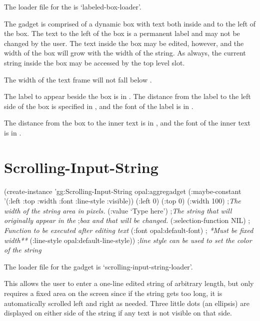 The loader file for the  is `labeled-box-loader'.

The  gadget is comprised of a dynamic box with text
both inside and to the left of the box.  The text to the left of the
box is a permanent label and may not be changed by the user.  The text
inside the box may be edited, however, and the width of the box will
grow with the width of the string.  As always, the current string
inside the box may be accessed by the top level  slot.

The width of the text frame will not fall below .

The label to appear beside the box is in .  The
distance from the label to the left side of the box is specified in
, and the font of the label is in .

The distance from the box to the inner text is in ,
and the font of the inner text is in .

\section{Scrolling-Input-String}
\label{scrolling-input-string}

\begin{programexample}
(create-instance 'gg:Scrolling-Input-String opal:aggregadget
   (:maybe-constant '(:left :top :width :font :line-style :visible))
   (:left 0)
   (:top 0)
   (:width 100) ;{\it  The width of the string area in pixels.}
   (:value `Type here') ;{\it The string that will originally appear in the}
			;{\it   box and that will be changed.}
   (:selection-function NIL) ; {\it Function to be executed after editing text}
   (:font opal:default-font) ; {\it **Must be fixed width**}
   (:line-style opal:default-line-style)) ;{\it line style can be used to set the color of the string}
\end{programexample}

\begin{center}
\end{center}

The loader file for the  gadget is
`scrolling-input-string-loader'.

This allows the user to enter a one-line edited string of arbitrary
length, but only requires a fixed area on the screen since if the
string gets too long, it is automatically scrolled left and right as
needed.  Three little dots (an ellipsis) are displayed on either side
of the string if any text is not visible on that side.

